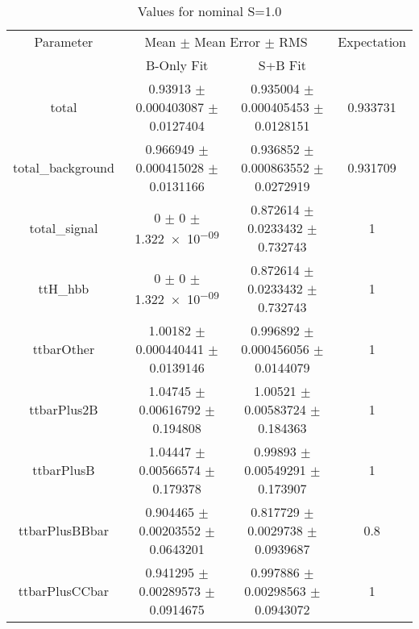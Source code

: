 \begin{table}
\centering
\caption{Values for nominal S=1.0}
\begin{tabular}{cccc}
\toprule
Parameter & \multicolumn{2}{c}{Mean $\pm$ Mean Error $\pm$ RMS} & Expectation\\
 & B-Only Fit & S+B Fit & \\
\midrule
total & \num{0.93913} $\pm$ \num{0.000403087} $\pm$ \num{0.0127404} & \num{0.935004} $\pm$ \num{0.000405453} $\pm$ \num{0.0128151} & \num{0.933731}\\
total\_background & \num{0.966949} $\pm$ \num{0.000415028} $\pm$ \num{0.0131166} & \num{0.936852} $\pm$ \num{0.000863552} $\pm$ \num{0.0272919} & \num{0.931709}\\
total\_signal & \num{0} $\pm$ \num{0} $\pm$ \num{1.322e-09} & \num{0.872614} $\pm$ \num{0.0233432} $\pm$ \num{0.732743} & \num{1}\\
ttH\_hbb & \num{0} $\pm$ \num{0} $\pm$ \num{1.322e-09} & \num{0.872614} $\pm$ \num{0.0233432} $\pm$ \num{0.732743} & \num{1}\\
ttbarOther & \num{1.00182} $\pm$ \num{0.000440441} $\pm$ \num{0.0139146} & \num{0.996892} $\pm$ \num{0.000456056} $\pm$ \num{0.0144079} & \num{1}\\
ttbarPlus2B & \num{1.04745} $\pm$ \num{0.00616792} $\pm$ \num{0.194808} & \num{1.00521} $\pm$ \num{0.00583724} $\pm$ \num{0.184363} & \num{1}\\
ttbarPlusB & \num{1.04447} $\pm$ \num{0.00566574} $\pm$ \num{0.179378} & \num{0.99893} $\pm$ \num{0.00549291} $\pm$ \num{0.173907} & \num{1}\\
ttbarPlusBBbar & \num{0.904465} $\pm$ \num{0.00203552} $\pm$ \num{0.0643201} & \num{0.817729} $\pm$ \num{0.0029738} $\pm$ \num{0.0939687} & \num{0.8}\\
ttbarPlusCCbar & \num{0.941295} $\pm$ \num{0.00289573} $\pm$ \num{0.0914675} & \num{0.997886} $\pm$ \num{0.00298563} $\pm$ \num{0.0943072} & \num{1}\\
\bottomrule
\end{tabular}
\end{table}